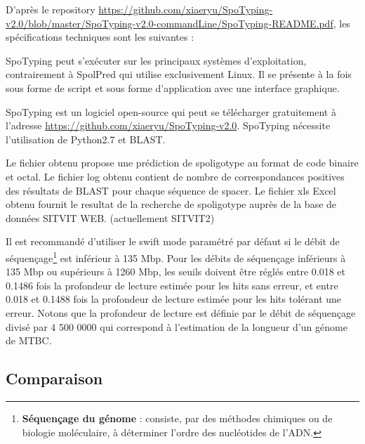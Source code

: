 \documentclass[twoside,a4paper,11pt,frenchb,openany]{report}
\begin{document}
D'après le repository \url{https://github.com/xiaeryu/SpoTyping-v2.0/blob/master/SpoTyping-v2.0-commandLine/SpoTyping-README.pdf}, les spécifications techniques sont les suivantes :

SpoTyping peut s'exécuter sur les principaux systèmes d'exploitation, contrairement à SpolPred qui utilise exclusivement Linux. Il se présente à la fois sous forme de script et sous forme d'application avec une interface graphique.

SpoTyping est un logiciel open-source qui peut se télécharger gratuitement à l'adresse \url{https://github.com/xiaeryu/SpoTyping-v2.0}. SpoTyping nécessite l'utilisation de Python2.7 et BLAST.

Le fichier obtenu propose une prédiction de spoligotype au format de code binaire et octal. Le fichier log obtenu contient de nombre de correspondances positives des résultats de BLAST pour chaque séquence de spacer. Le fichier xls Excel obtenu fournit le resultat de la recherche de spoligotype auprès de la base de données SITVIT WEB. (actuellement SITVIT2)

Il est recommandé d'utiliser le swift mode paramétré par défaut si le débit de séquençage\footnote{\textbf{Séquençage du génome} : consiste, par des méthodes chimiques ou de biologie moléculaire, à déterminer l'ordre des nucléotides de l'ADN.} est inférieur à 135 Mbp. Pour les débits de séquençage inférieurs à 135 Mbp ou supérieurs à 1260 Mbp, les seuils doivent être réglés entre 0.018 et 0.1486 fois la profondeur de lecture estimée pour les hits sans erreur, et entre 0.018 et 0.1488 fois la profondeur de lecture estimée pour les hits tolérant une erreur. Notons que la profondeur de lecture est définie par le débit de séquençage divisé par 4 500 0000 qui correspond à l'estimation de la longueur d'un génome de MTBC.

\subsection{Comparaison}
\end{document}
